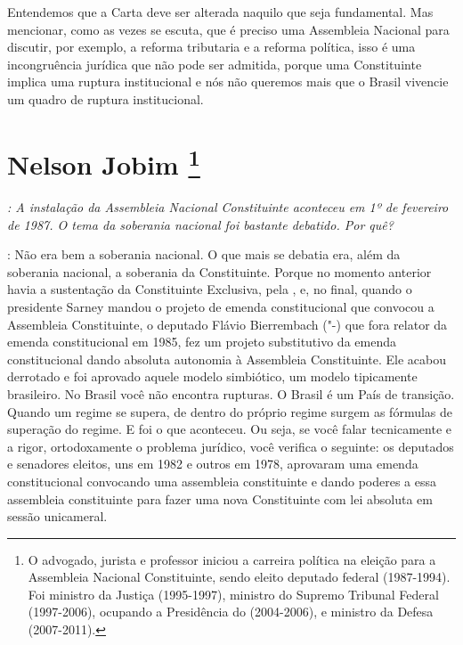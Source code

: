 Entendemos que a Carta deve ser alterada naquilo que seja fundamental.
Mas mencionar, como as vezes se escuta, que é preciso uma Assembleia
Nacional para discutir, por exemplo, a reforma tributaria e a reforma
política, isso é uma incongruência jurídica que não pode ser admitida,
porque uma Constituinte implica uma ruptura institucional e nós não
queremos mais que o Brasil vivencie um quadro de ruptura institucional.

\chapter{Nelson Jobim
\footnote{O advogado, jurista e professor iniciou a carreira política na eleição
para a Assembleia Nacional Constituinte, sendo eleito deputado federal
(1987-1994). Foi ministro da Justiça (1995-1997), ministro do Supremo
Tribunal Federal (1997-2006), ocupando a Presidência do  (2004-2006),
e ministro da Defesa (2007-2011).}}

\emph{: A instalação da Assembleia Nacional Constituinte aconteceu em 1º
de fevereiro de 1987. O tema da soberania nacional foi bastante
debatido. Por quê?}

: Não era bem a soberania nacional. O que mais se debatia
era, além da soberania nacional, a soberania da Constituinte. Porque no
momento anterior havia a sustentação da Constituinte Exclusiva, pela
, e, no final, quando o presidente Sarney mandou o projeto de emenda
constitucional que convocou a Assembleia Constituinte, o deputado Flávio
Bierrembach ("-) que fora relator da emenda constitucional em 1985,
fez um projeto substitutivo da emenda constitucional dando absoluta
autonomia à Assembleia Constituinte. Ele acabou derrotado e foi aprovado
aquele modelo simbiótico, um modelo tipicamente brasileiro. No Brasil
você não encontra rupturas. O Brasil é um País de transição. Quando um
regime se supera, de dentro do próprio regime surgem as fórmulas de
superação do regime. E foi o que aconteceu. Ou seja, se você falar
tecnicamente e a rigor, ortodoxamente o problema jurídico, você verifica
o seguinte: os deputados e senadores eleitos, uns em 1982 e outros em
1978, aprovaram uma emenda constitucional convocando uma assembleia
constituinte e dando poderes a essa assembleia constituinte para fazer
uma nova Constituinte com lei absoluta em sessão unicameral.

